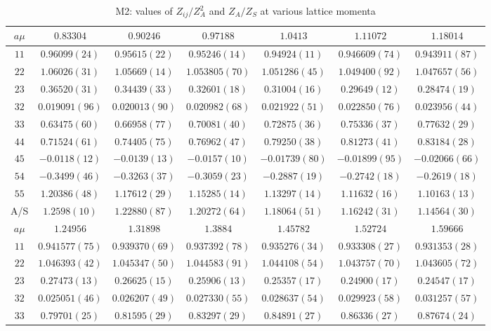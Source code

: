 \begin{table}
\begin{center}
\caption{M2: values of $Z_{ij}/Z_A^2$ and $Z_A/Z_S$ at various lattice momenta}
\begin{tabular}{c|c c c c c c}
\hline
\hline
$a\mu$ & $0.83304$ & $0.90246$ & $0.97188$ & $1.0413$ & $1.11072$ & $1.18014$ \\
\hline
$11$ & $0.96099(24)$ & $0.95615(22)$ & $0.95246(14)$ & $0.94924(11)$ & $0.946609(74)$ & $0.943911(87)$ \\
$22$ & $1.06026(31)$ & $1.05669(14)$ & $1.053805(70)$ & $1.051286(45)$ & $1.049400(92)$ & $1.047657(56)$ \\
$23$ & $0.36520(31)$ & $0.34439(33)$ & $0.32601(18)$ & $0.31004(16)$ & $0.29649(12)$ & $0.28474(19)$ \\
$32$ & $0.019091(96)$ & $0.020013(90)$ & $0.020982(68)$ & $0.021922(51)$ & $0.022850(76)$ & $0.023956(44)$ \\
$33$ & $0.63475(60)$ & $0.66958(77)$ & $0.70081(40)$ & $0.72875(36)$ & $0.75336(37)$ & $0.77632(29)$ \\
$44$ & $0.71524(61)$ & $0.74405(75)$ & $0.76962(47)$ & $0.79250(38)$ & $0.81273(41)$ & $0.83184(28)$ \\
$45$ & $-0.0118(12)$ & $-0.0139(13)$ & $-0.0157(10)$ & $-0.01739(80)$ & $-0.01899(95)$ & $-0.02066(66)$ \\
$54$ & $-0.3499(46)$ & $-0.3263(37)$ & $-0.3059(23)$ & $-0.2887(19)$ & $-0.2742(18)$ & $-0.2619(18)$ \\
$55$ & $1.20386(48)$ & $1.17612(29)$ & $1.15285(14)$ & $1.13297(14)$ & $1.11632(16)$ & $1.10163(13)$ \\
\hline
A/S & $1.2598(10)$ & $1.22880(87)$ & $1.20272(64)$ & $1.18064(51)$ & $1.16242(31)$ & $1.14564(30)$ \\
\hline
$a\mu$ & $1.24956$ & $1.31898$ & $1.3884$ & $1.45782$ & $1.52724$ & $1.59666$ \\
\hline
$11$ & $0.941577(75)$ & $0.939370(69)$ & $0.937392(78)$ & $0.935276(34)$ & $0.933308(27)$ & $0.931353(28)$ \\
$22$ & $1.046393(42)$ & $1.045347(50)$ & $1.044583(91)$ & $1.044108(54)$ & $1.043757(70)$ & $1.043605(72)$ \\
$23$ & $0.27473(13)$ & $0.26625(15)$ & $0.25906(13)$ & $0.25357(17)$ & $0.24900(17)$ & $0.24547(17)$ \\
$32$ & $0.025051(46)$ & $0.026207(49)$ & $0.027330(55)$ & $0.028637(54)$ & $0.029923(58)$ & $0.031257(57)$ \\
$33$ & $0.79701(25)$ & $0.81595(29)$ & $0.83297(29)$ & $0.84891(27)$ & $0.86336(27)$ & $0.87674(24)$ \\

\end{tabular}
\end{center}
\end{table}

